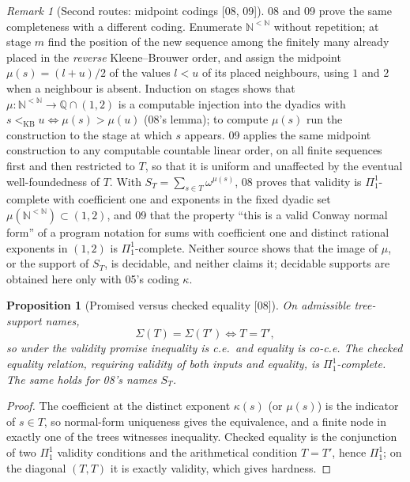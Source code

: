 \documentclass[11pt,oneside]{article}
\numberwithin{equation}{section}
\newtheorem{proposition}[proposition]{Proposition}
\theoremstyle{definition}
\theoremstyle{remark}
\newtheorem{remark}[remark]{Remark}
\newcommand{\N}{\mathbb N}
\newcommand{\Q}{\mathbb Q}
\newcommand{\kb}{<_{\mathrm{KB}}}
\newcommand{\src}[1]{\textup{\textsf{\small[#1]}}}
\begin{document}
\begin{remark}[Second routes: midpoint codings \src{08, 09}]\label{onot:neg:rem:secondroute}
08 and 09 prove the same completeness with a different coding. Enumerate
$\N^{<\N}$ without repetition; at stage $m$ find the position of the new sequence
among the finitely many already placed in the \emph{reverse} Kleene--Brouwer order,
and assign the midpoint $\mu(s)=(l+u)/2$ of the values $l<u$ of its placed
neighbours, using $1$ and $2$ when a neighbour is absent. Induction on stages shows
that $\mu:\N^{<\N}\to\Q\cap(1,2)$ is a computable injection into the dyadics with
$s\kb u\iff\mu(s)>\mu(u)$ (08's lemma); to compute $\mu(s)$ run the construction to
the stage at which $s$ appears. 09 applies the same midpoint construction to any
computable countable linear order, on all finite sequences first and then
restricted to $T$, so that it is uniform and unaffected by the eventual
well-foundedness of $T$. With $S_T=\sum_{s\in T}\omega^{\mu(s)}$, 08 proves that
validity is $\Pi^1_1$-complete with coefficient one and exponents in the fixed
dyadic set $\mu(\N^{<\N})\subset(1,2)$, and 09 that the property ``this is a valid
Conway normal form'' of a program notation for sums with coefficient one and
distinct rational exponents in $(1,2)$ is $\Pi^1_1$-complete. Neither source shows
that the image of $\mu$, or the support of $S_T$, is decidable, and neither claims
it; decidable supports are obtained here only with 05's coding $\kappa$.
\end{remark}

\begin{proposition}[Promised versus checked equality \src{08}]\label{onot:neg:prop:treeequality}
On admissible tree-support names,
\[
 \Sigma(T)=\Sigma(T')\iff T=T',
\]
so under the validity promise inequality is c.e.\ and equality is co-c.e. The
checked equality relation, requiring validity of both inputs and equality, is
$\Pi^1_1$-complete. The same holds for 08's names $S_T$.
\end{proposition}
\begin{proof}
The coefficient at the distinct exponent $\kappa(s)$ (or $\mu(s)$) is the indicator
of $s\in T$, so normal-form uniqueness gives the equivalence, and a finite node in
exactly one of the trees witnesses inequality. Checked equality is the conjunction
of two $\Pi^1_1$ validity conditions and the arithmetical condition $T=T'$, hence
$\Pi^1_1$; on the diagonal $(T,T)$ it is exactly validity, which gives hardness.
\end{proof}
\end{document}
